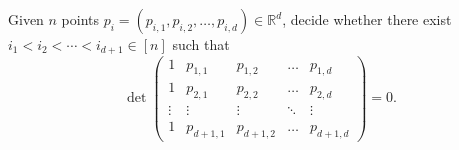 \begin{problem}[GPT in \(\mathbb{R}^d\),label=problem:gpt-d]
	Given \(n\) points \(p_i = (p_{i,1},p_{i,2}, \ldots, p_{i,d}) \in \mathbb{R}^d\), decide
	whether there exist \(i_1 < i_2 < \cdots < i_{d+1} \in [n]\) such that
	\begin{displaymath}
		\det
		\left(
		\begin{matrix}
			1 & p_{1,1} & p_{1,2} & \hdots & p_{1,d} \\
			1 & p_{2,1} & p_{2,2} & \hdots & p_{2,d} \\
			\vdots & \vdots & \vdots & \ddots & \vdots \\
			1 & p_{d+1,1} & p_{d+1,2} & \hdots & p_{d+1,d}
		\end{matrix}
		\right)
		= 0.
	\end{displaymath}
\end{problem}
